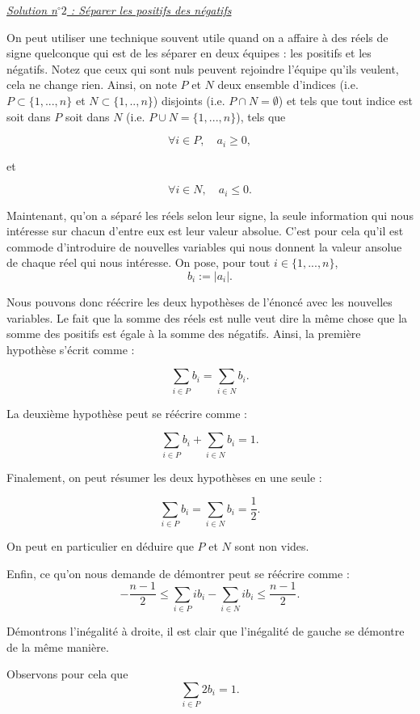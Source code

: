 \begin{sol}

\underline{\textit{Solution n$^\circ 2$ : Séparer les positifs des négatifs}}

On peut utiliser une technique souvent utile quand on a affaire à des réels de signe quelconque qui est de les séparer en deux équipes : les positifs et les négatifs. Notez que ceux qui sont nuls peuvent rejoindre l'équipe qu'ils veulent, cela ne change rien. Ainsi, on note $P$ et $N$ deux ensemble d'indices (i.e. $P \subset \{1,...,n\}$ et $N \subset \{1,..,n\}$) disjoints (i.e. $P \cap N = \emptyset$) et tels que tout indice est soit dans $P$ soit dans $N$ (i.e. $P \cup N =\{1,...,n\}$), tels que

\[
\forall i \in P, \quad a_i \geq 0,
\]

et

\[
\forall i \in N, \quad a_i \leq 0.
\]

Maintenant, qu'on a séparé les réels selon leur signe, la seule information qui nous intéresse sur chacun d'entre eux est leur valeur absolue. C'est pour cela qu'il est commode d'introduire de nouvelles variables qui nous donnent la valeur ansolue de chaque réel qui nous intéresse. On pose, pour tout $i \in \{1,...,n\}$,
\[
b_i := \vert a_i \vert.
\]

Nous pouvons donc réécrire les deux hypothèses de l'énoncé avec les nouvelles variables. Le fait que la somme des réels est nulle veut dire la même chose que la somme des positifs est égale à la somme des négatifs. Ainsi, la première hypothèse s'écrit comme :

\[
\sum_{i \in P} b_i = \sum_{i \in N} b_i.
\]

La deuxième hypothèse peut se réécrire comme :

\[
\sum_{i \in P} b_i + \sum_{i \in N} b_i =1.
\]

Finalement, on peut résumer les deux hypothèses en une seule :

\[
\sum_{i \in P} b_i = \sum_{i \in N} b_i = \frac12.
\]

On peut en particulier en déduire que $P$ et $N$ sont non vides.

Enfin, ce qu'on nous demande de démontrer peut se réécrire comme :
\[
-\frac{n-1}2 \leq \sum_{i \in P} ib_i - \sum_{i \in N} ib_i \leq \frac{n-1}2.
\]

Démontrons l'inégalité à droite, il est clair que l'inégalité de gauche se démontre de la même manière.

Observons pour cela que
\[
\sum_{i \in P} 2b_i =1.
\]


\end{sol}
